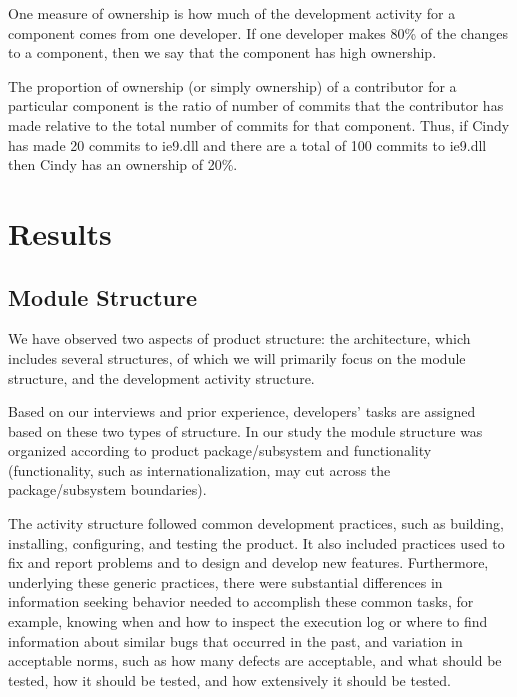 \documentclass{sig-alternate-05-2015}
\begin{document}
One measure of ownership
is how much  of  the  development  activity  for  a  component
comes from one developer. If one developer makes 80\% of
the changes to a component, then we say that the component has high 
ownership. 

  The proportion of ownership  (or  simply  ownership)  of  a  contributor  for  a
particular component is the ratio of number of commits that the contributor has made 
relative to the total number of commits for that component.  Thus, if
Cindy has made 20 commits to ie9.dll and there are
a total of 100 commits to ie9.dll then Cindy has an ownership of 20\%.



\section{Results}\label{s:result}


\subsection{Module Structure}
We have observed two aspects of product structure: the architecture, 
which includes several structures, of which we will primarily focus 
on the module structure, and the development activity structure. 

Based on our interviews and prior experience, developers' tasks are 
assigned based on these two types of structure. In our study the 
module structure was organized according to product package/subsystem 
and functionality (functionality, such as internationalization, may cut 
across the package/subsystem boundaries). 

The activity structure followed common development practices, such as 
building, installing, configuring, and testing the product. It also 
included practices used to fix and report problems and to design and 
develop new features. Furthermore, underlying these generic practices, 
there were substantial differences in information seeking behavior needed 
to accomplish these common tasks, for example, knowing when and how to 
inspect the execution log or where to find information about similar bugs 
that occurred in the past, and variation in acceptable norms, such as how 
many defects are acceptable, and what should be tested, how it should be 
tested, and how extensively it should be tested. 
\end{document}
